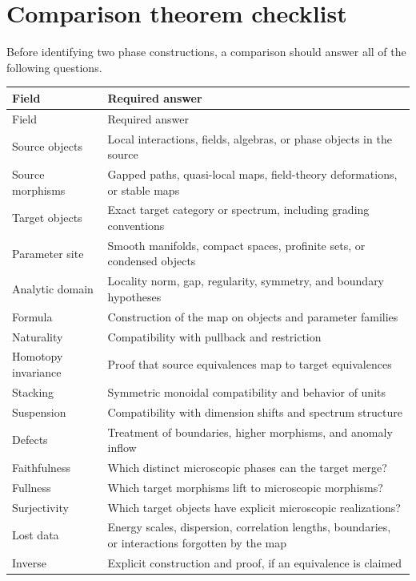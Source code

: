 \documentclass[12pt]{article}
\theoremstyle{definition}
\theoremstyle{remark}
\begin{document}
\section{Comparison theorem checklist}

Before identifying two phase constructions, a comparison should answer all
of the following questions.

\begin{longtable}{>{\raggedright\arraybackslash}p{}
                  >{\raggedright\arraybackslash}p{}}
\toprule
Field & Required answer \\
\midrule
\endfirsthead
\toprule
Field & Required answer \\
\midrule
\endhead
Source objects & Local interactions, fields, algebras, or phase objects in the source \\
Source morphisms & Gapped paths, quasi-local maps, field-theory deformations, or stable maps \\
Target objects & Exact target category or spectrum, including grading conventions \\
Parameter site & Smooth manifolds, compact spaces, profinite sets, or condensed objects \\
Analytic domain & Locality norm, gap, regularity, symmetry, and boundary hypotheses \\
Formula & Construction of the map on objects and parameter families \\
Naturality & Compatibility with pullback and restriction \\
Homotopy invariance & Proof that source equivalences map to target equivalences \\
Stacking & Symmetric monoidal compatibility and behavior of units \\
Suspension & Compatibility with dimension shifts and spectrum structure \\
Defects & Treatment of boundaries, higher morphisms, and anomaly inflow \\
Faithfulness & Which distinct microscopic phases can the target merge? \\
Fullness & Which target morphisms lift to microscopic morphisms? \\
Surjectivity & Which target objects have explicit microscopic realizations? \\
Lost data & Energy scales, dispersion, correlation lengths, boundaries, or interactions forgotten by the map \\
Inverse & Explicit construction and proof, if an equivalence is claimed \\
\bottomrule
\end{longtable}
\end{document}
